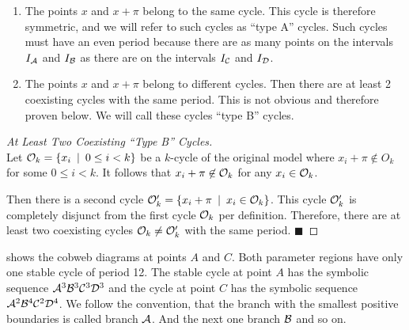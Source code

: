 \begin{enumerate}[label=(\Alph*)]
	\item The points $x$ and $x + \pi$ belong to the same cycle.
	      This cycle is therefore symmetric, and we will refer to such cycles as ``type A'' cycles.
	      Such cycles must have an even period because there are as many points on the intervals $I_{\mathcal{A}}$ and $I_{\mathcal{B}}$ as there are on the intervals $I_{\mathcal{C}}$ and $I_{\mathcal{D}}$.
	\item The points $x$ and $x + \pi$ belong to different cycles.
	      Then there are at least 2 coexisting cycles with the same period.
	      This is not obvious and therefore proven below. %
	      We will call these cycles ``type B'' cycles.
\end{enumerate}

\begin{proof}[At Least Two Coexisting ``Type B'' Cycles] \phantom{x} \\
	Let $\mathcal{O}_k = \left\{x_i \:\mid\: 0 \leq i < k\right\}$ be a $k$-cycle of the original model where $x_i + \pi \not\in O_k$ for some $0 \leq i < k$.
	It follows that $x_i + \pi \not\in \mathcal{O}_k$ for any $x_i \in \mathcal{O}_k$.

	Then there is a second cycle $\mathcal{O}'_k = \left\{x_i + \pi \:\mid\: x_i \in \mathcal{O}_k\right\}$.
	This cycle $\mathcal{O}'_k$ is completely disjunct from the first cycle $\mathcal{O}_k$ per definition.
	Therefore, there are at least two coexisting cycles $\mathcal{O}_k \neq \mathcal{O}'_k$ with the same period. \hfill	$\blacksquare$
\end{proof}

 shows the cobweb diagrams at points $A$ and $C$.
Both parameter regions have only one stable cycle of period 12.
The stable cycle at point $A$ has the symbolic sequence $\mathcal{A}^3\mathcal{B}^3\mathcal{C}^3\mathcal{D}^3$ and the cycle at point $C$ has the symbolic sequence $\mathcal{A}^2\mathcal{B}^4\mathcal{C}^2\mathcal{D}^4$.
We follow the convention, that the branch with the smallest positive boundaries is called branch $\mathcal{A}$.
And the next one branch $\mathcal{B}$ and so on.

